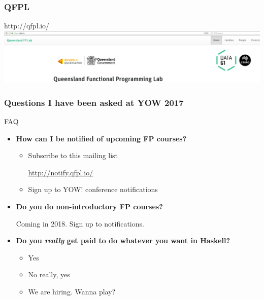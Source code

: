 \begin{frame}
\frametitle{QFPL}
\begin{block}{http://qfpl.io/}
\includegraphics[height=0.24\textheight]{image/qfpl-io.png}
\end{block}
\end{frame}

\begin{frame}
\frametitle{Questions I have been asked at YOW 2017}
\begin{block}{FAQ}
\begin{itemize}
\item<1-> \textbf{How can I be notified of upcoming FP courses?}
  \begin{itemize}
  \item Subscribe to this mailing list

        \url{http://notify.qfpl.io/}
  \item Sign up to YOW! conference notifications
  \end{itemize}
\item<2-> \textbf{Do you do non-introductory FP courses?}

  Coming in 2018. Sign up to notifications.
\item<3-> \textbf{Do you \emph{really} get paid to do whatever you want in Haskell?}
  \begin{itemize}
  \item<3-> Yes
  \item<4-> No really, yes
  \item<5-> We are hiring. Wanna play?
  \end{itemize}
\end{itemize}
\end{block}
\end{frame}
